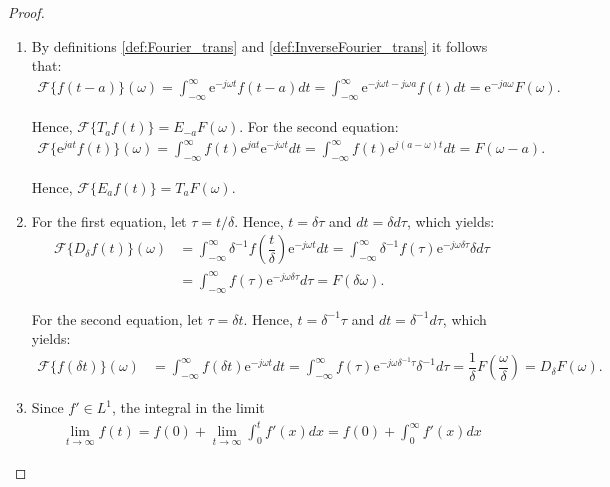 \begin{proof}

\begin{enumerate}[label=(\alph*)]
\item
By definitions \ref{def:Fourier_trans} and \ref{def:InverseFourier_trans} it follows that:
\begin{align*}
\mathcal{F}\{f(t-a)\}(\omega) = \int_{-\infty}^\infty \text{e}^{-j\omega t} f(t - a) dt = \int_{-\infty}^\infty \text{e}^{-j\omega t - j\omega a} f(t) dt = \text{e}^{-ja \omega} F(\omega).
\end{align*}

Hence, $\mathcal{F}\{T_a f(t)\} = E_{-a} F(\omega)$. For the second equation:
\begin{align*}
\mathcal{F}\{\text{e}^{jat} f(t)\}(\omega) = \int_{-\infty}^\infty f(t) \text{e}^{jat} \text{e}^{-j \omega t} dt = \int_{-\infty}^\infty f(t) \text{e}^{j(a- \omega)t} dt = F(\omega - a).
\end{align*}

Hence, $\mathcal{F}\{E_a f(t)\} = T_a F(\omega)$.

\item For the first equation, let $\tau = t/\delta$. Hence, $t = \delta \tau$ and $dt = \delta d\tau$, which yields:
\begin{align*}
\mathcal{F}\{D_\delta f(t)\}(\omega) &= \int_{-\infty}^\infty \delta^{-1} f\left( \dfrac{t}{\delta} \right) \text{e}^{-j \omega t} dt = \int_{-\infty}^\infty \delta^{-1} f(\tau) \text{e}^{-j \omega \delta \tau} \delta d\tau \\
&= \int_{-\infty}^\infty f(\tau) \text{e}^{-j \omega \delta\tau} d\tau = F(\delta\omega).
\end{align*}

For the second equation, let $\tau = \delta t$. Hence, $t = \delta^{-1}\tau$ and $dt = \delta^{-1} d\tau$, which yields:
\begin{align*}
\mathcal{F}\{f(\delta t)\}(\omega) &= \int_{-\infty}^\infty f(\delta t) \text{e}^{-j \omega t} dt = \int_{-\infty}^\infty f(\tau) \text{e}^{-j \omega \delta^{-1}\tau} \delta^{-1} d\tau = \dfrac{1}{\delta} F \left( \dfrac{\omega}{\delta} \right) = D_\delta F(\omega).
\end{align*}

\item Since $f' \in L^1$, the integral in the limit
\begin{align*}
\lim_{t \to \infty} f(t) = f(0) + \lim_{t\to\infty} \int_0^t f'(x) dx = f(0) + \int_0^\infty f'(x) dx
\end{align*}


\end{enumerate}
\end{proof}
